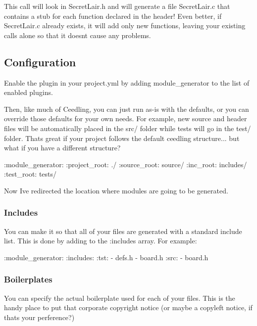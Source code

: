 This call will look in Secret\+Lair.\+h and will generate a file Secret\+Lair.\+c that contains a stub for each function declared in the header! Even better, if Secret\+Lair.\+c already exists, it will add only new functions, leaving your existing calls alone so that it doesn\textquotesingle{}t cause any problems.

\subsection*{Configuration}

Enable the plugin in your project.\+yml by adding {\ttfamily module\+\_\+generator} to the list of enabled plugins.

Then, like much of Ceedling, you can just run as-\/is with the defaults, or you can override those defaults for your own needs. For example, new source and header files will be automatically placed in the {\ttfamily src/} folder while tests will go in the {\ttfamily test/} folder. That\textquotesingle{}s great if your project follows the default ceedling structure... but what if you have a different structure?


\begin{DoxyCode}
:module\_generator:
  :project\_root: ./
  :source\_root: source/
  :inc\_root: includes/
  :test\_root: tests/
\end{DoxyCode}


Now I\textquotesingle{}ve redirected the location where modules are going to be generated.

\subsubsection*{Includes}

You can make it so that all of your files are generated with a standard include list. This is done by adding to the {\ttfamily \+:includes} array. For example\+:


\begin{DoxyCode}
:module\_generator:
  :includes:
    :tst:
      - defs.h
      - board.h
    :src:
      - board.h
\end{DoxyCode}


\subsubsection*{Boilerplates}

You can specify the actual boilerplate used for each of your files. This is the handy place to put that corporate copyright notice (or maybe a copyleft notice, if that\textquotesingle{}s your perference?)


